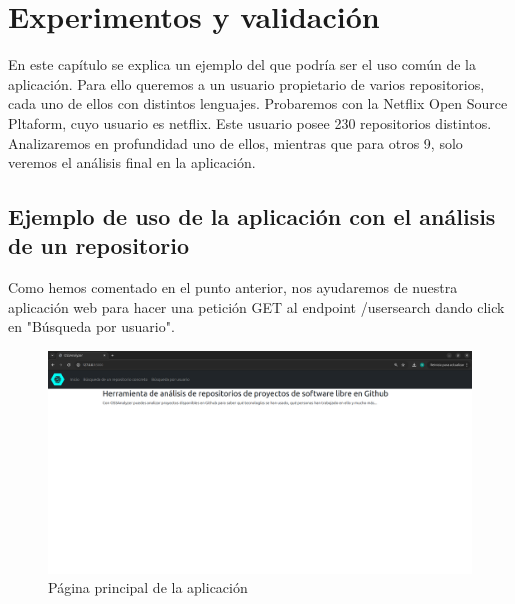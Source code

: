\documentclass[a4paper, 12pt]{book}
\begin{document}

\cleardoublepage
\chapter{Experimentos y validación}
\label{chap:experimentos}

En este capítulo se explica un ejemplo del que podría ser el uso común de la aplicación. Para ello queremos a un usuario propietario de varios repositorios, cada uno de ellos con distintos lenguajes. Probaremos con la Netflix Open Source Pltaform, cuyo usuario es netflix. Este usuario posee 230 repositorios distintos. Analizaremos en profundidad uno de ellos, mientras que para otros 9, solo veremos el análisis final en la aplicación.

\section{Ejemplo de uso de la aplicación con el análisis de un repositorio}
\label{sec:Ejemplo de uso de la aplicación con el análisis de un repositorio}

Como hemos comentado en el punto anterior, nos ayudaremos de nuestra aplicación web para hacer una petición GET al endpoint /usersearch dando click en "Búsqueda por usuario".

\begin{figure}[H]
  \centering
  \includegraphics[width=1\textwidth]{img/paginaprincipal.png}
  \caption{Página principal de la aplicación}
  \label{figura:mainpage2}
\end{figure}
\end{document}
